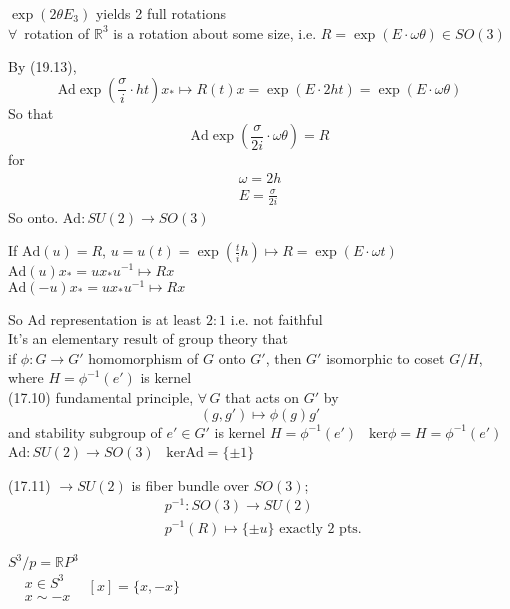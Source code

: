 $\exp{ \left( 2\theta E_3 \right)}$ yields 2 full rotations \\

$\forall \, $ rotation of $\mathbb{R}^3$ is a rotation about some size, i.e. $R = \exp{ (E\cdot \omega \theta)} \in SO(3)$

By (19.13), 
\[
\text{Ad}\exp{ \left( \frac{\sigma}{i} \cdot h t \right) }x_* \mapsto R(t) x = \exp{ (E\cdot 2h t ) } = \exp{ ( E\cdot \omega \theta ) }
\]
So that 
\[
\text{Ad}\exp{ \left( \frac{\sigma}{2i} \cdot \omega \theta \right) } = R
\]
for 
\[
\begin{aligned}
  \omega = 2h \\ 
  E = \frac{\sigma}{2i}
\end{aligned}
\]
So  onto.  $\text{Ad}: SU(2) \to SO(3)$

If $\text{Ad}(u) = R$, $u=u(t) = \exp{ \left( \frac{t}{i} h \right)} \mapsto R = \exp{ (E\cdot \omega t)}$
\phantom{If }$\text{Ad}(u)x_* = ux_*u^{-1} \mapsto Rx$ \\ 
\phantom{If }$\text{Ad}(-u)x_* = u x_*u^{-1} \mapsto Rx$

So $\text{Ad}$ representation is at least $2:1$ i.e. not faithful \\

It's an elementary result of group theory that \\
\phantom{It's } if $\phi : G \to G'$ homomorphism of $G$ onto $G'$, then $G'$ isomorphic to coset $G/H$, where $H=\phi^{-1}(e')$ is kernel \\

(17.10) fundamental principle, $\forall \, G$ that acts on $G'$ by 
\[
(g,g') \mapsto \phi(g)g'
\]
and stability subgroup of $e'\in G'$ is kernel $H= \phi^{-1}(e')$ \quad \quad \, $\text{ker}{\phi} = H = \phi^{-1}(e')$ \\

$\text{Ad}:SU(2) \to SO(3)$ \quad \quad \, $\text{ker}{\text{Ad}} = \lbrace \pm 1 \rbrace$

(17.11) $\to SU(2)$ is fiber bundle over $SO(3)$; 
\[
\begin{aligned}
  & p^{-1} : SO(3) \to SU(2) \\ 
  & p^{-1}(R) \mapsto \lbrace \pm u \rbrace \text{ exactly 2 pts. }
\end{aligned}
\]


$S^3/p = \mathbb{R}P^3$ \\
$\begin{aligned}
  & x\in S^3 \\
  & x\sim -x\end{aligned}$ \quad \, $[x] = \lbrace x,-x\rbrace$

